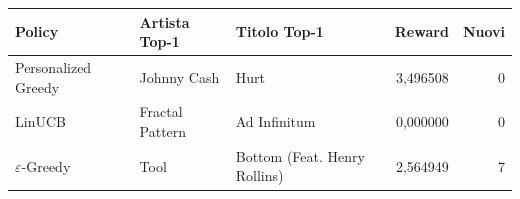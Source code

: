 \begin{tabular}{lp{2.6cm}p{4.3cm}rr}
\toprule
Policy & Artista Top-1 & Titolo Top-1 & Reward & Nuovi \\
\midrule
Personalized Greedy & Johnny Cash & Hurt & 3,496508 & 0 \\
LinUCB & Fractal Pattern & Ad Infinitum & 0,000000 & 0 \\
$\varepsilon$-Greedy & Tool & Bottom (Feat. Henry Rollins) & 2,564949 & 7 \\
\bottomrule
\end{tabular}
